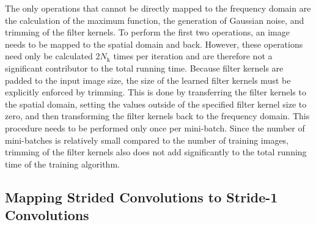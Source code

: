 The only operations that cannot be directly mapped to the frequency domain are
the calculation of the maximum function, the generation of Gaussian noise, and
trimming of the filter kernels. To perform the first two operations, an image
needs to be mapped to the spatial domain and back. However, these operations
need only be calculated $2N_\text{k}$ times per iteration and are therefore not
a significant contributor to the total running time. Because filter kernels are
padded to the input image size, the size of the learned filter kernels must be
explicitly enforced by trimming. This is done by transferring the filter kernels
to the spatial domain, setting the values outside of the specified filter kernel
size to zero, and then transforming the filter kernels back to the frequency
domain. This procedure needs to be performed only once per mini-batch. Since the
number of mini-batches is relatively small compared to the number of training
images, trimming of the filter kernels also does not add significantly to the
total running time of the training algorithm.

\subsection{Mapping Strided Convolutions to Stride-1 Convolutions}
\label{sec:training:strided}


